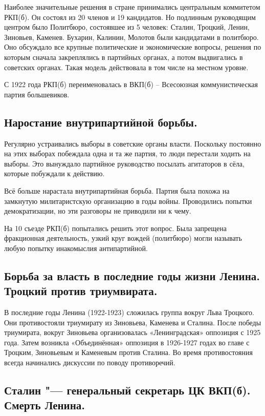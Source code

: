 Наиболее значительные решения в стране принимались центральным коммитетом РКП(б). Он состоял из 20 членов и 19 кандидатов. Но подлинным руководящим центром было Политбюро, состоявшее из 5 человек: Сталин, Троцкий, Ленин, Зиновьев, Каменев. Бухарин, Калинин, Молотов были кандидатами в политбюро. Оно обсуждало все крупные политические и экономические вопросы, решения по которым сначала закреплялись в партийных органах, а потом выдвигались в советских органах. Такая модель действовала в том числе на местном уровне.

С 1922 года РКП(б) переименовалась в ВКП(б) – Всесоюзная коммунистическая партия большевиков.

\subsection{Наростание внутрипартийной борьбы.} 

Регулярно устраивались выборы в советские органы власти. Поскольку постоянно на этих выборах побеждала одна и та же партия, то люди перестали ходить на выборы. Это вынуждало партийное руководство посылать агитаторов в сёла, которые побуждали к действию.

Всё больше нарастала внутрипартийная борьба. Партия была похожа на замкнутую милитаристскую организацию в годы войны. Проводились попытки демократизации, но эти разговоры не приводили ни к чему.

На 10 съезде РКП(б) попытались решить этот вопрос. Была запрещена фракционная деятельность, узкий круг вождей (политбюро) могли называть любую попытку инакомыслия антипартийной.

\subsection{Борьба за власть в последние годы жизни Ленина. Троцкий против триумвирата.}

В последние годы Ленина (1922-1923) сложилась группа вокруг Льва Троцкого. Они противостояли триумирату из Зиновьева, Каменева и Сталина. После победы триумирата, вокруг Зиновьева организовалась «Ленинградская» оппозиция с 1925 года. Затем возникла «Объединённая» оппозиция в 1926-1927 годах во главе с Троцким, Зиновьевым и Каменевым против Сталина. Во время противостояния всегда начинались дискуссии по поводу противоречий.

\subsection{Сталин "--- генеральный секретарь ЦК ВКП(б). Смерть Ленина.}

